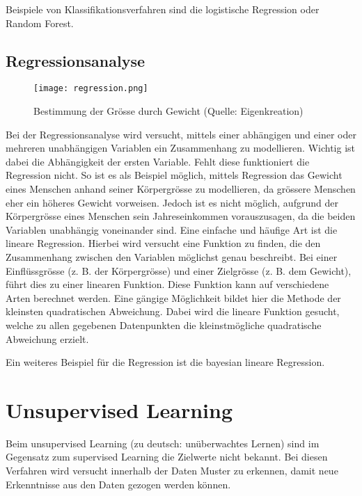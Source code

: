 Beispiele von Klassifikationsverfahren sind die logistische Regression oder Random Forest.

\subsection{Regressionsanalyse}
\begin{figure}[h!]
	\centering
	\texttt{[image: regression.png]}
	\caption{Bestimmung der Grösse durch Gewicht (Quelle: Eigenkreation)}
\end{figure}
Bei der Regressionsanalyse wird versucht, mittels einer abhängigen und einer oder mehreren unabhängigen Variablen ein Zusammenhang zu modellieren. Wichtig ist dabei die Abhängigkeit der ersten Variable. Fehlt diese funktioniert die Regression nicht. So ist es als Beispiel möglich, mittels Regression das Gewicht eines Menschen anhand seiner Körpergrösse zu modellieren, da grössere Menschen eher ein höheres Gewicht vorweisen. Jedoch ist es nicht möglich, aufgrund der Körpergrösse eines Menschen sein Jahreseinkommen vorauszusagen, da die beiden Variablen unabhängig voneinander sind.
Eine einfache und häufige Art ist die lineare Regression. Hierbei wird versucht eine Funktion zu finden, die den Zusammenhang zwischen den Variablen möglichst genau beschreibt. Bei einer Einflüssgrösse (z. B. der Körpergrösse) und einer Zielgrösse (z. B. dem Gewicht), führt dies zu einer linearen Funktion.
Diese Funktion kann auf verschiedene Arten berechnet werden. Eine gängige Möglichkeit bildet hier die Methode der kleinsten quadratischen Abweichung. Dabei wird die lineare Funktion gesucht, welche zu allen gegebenen Datenpunkten die kleinstmögliche quadratische Abweichung erzielt.

Ein weiteres Beispiel für die Regression ist die bayesian lineare Regression.

\section{Unsupervised Learning}
Beim unsupervised Learning (zu deutsch: unüberwachtes Lernen) sind im Gegensatz zum supervised Learning die Zielwerte nicht bekannt. Bei diesen Verfahren wird versucht innerhalb der Daten Muster zu erkennen, damit neue Erkenntnisse aus den Daten gezogen werden können.


